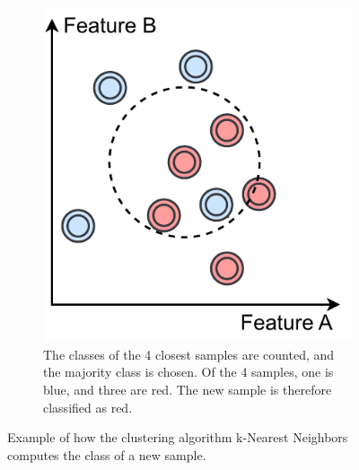\begin{figure}[htb]
{\begin{subfigure}[b]{0.37\textwidth}
             \end{subfigure}
             \hspace{0.015\textwidth}
             \begin{subfigure}[b]{0.37\textwidth}
                 \centering
                 \includegraphics[width=\textwidth]{images/knn_3}
                 \caption{The classes of the 4 closest samples are counted, and the majority class is chosen. Of the 4 samples, one is blue, and three are red. The new sample is therefore classified as red.} 
             \end{subfigure}
             }
            \caption[Figure showing k-Nearest Neighbors clustering.]{Example of how the clustering algorithm k-Nearest Neighbors computes the class of a new sample. 
            }
            \label{fig:knn}
        \end{figure}
        

